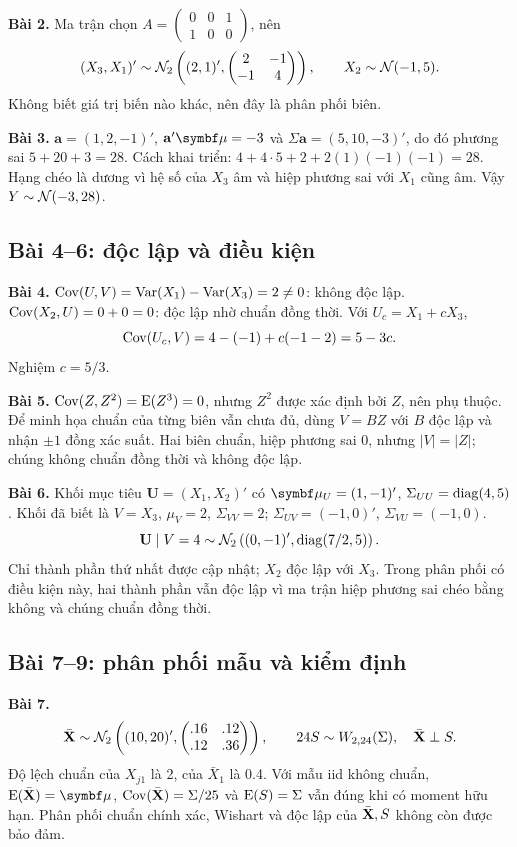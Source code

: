 \noindent\textbf{Bài 2.}
Ma trận chọn $A=\begin{pmatrix}0&0&1\\1&0&0\end{pmatrix}$, nên
\[
 (X_3,X_1)'\sim\mathcal N_2\left((2,1)',
 \begin{pmatrix}2&-1\\-1&4\end{pmatrix}\right),\qquad
 X_2\sim\mathcal N(-1,5).
\]
Không biết giá trị biến nào khác, nên đây là phân phối biên.

\noindent\textbf{Bài 3.}
$\mathbf a=(1,2,-1)'$, $\mathbf a'\vmu=-3$ và
$\Sigma\mathbf a=(5,10,-3)'$, do đó phương sai $5+20+3=28$.
Cách khai triển: $4+4\cdot5+2+2(1)(-1)(-1)=28$.
Hạng chéo là dương vì hệ số của $X_3$ âm và hiệp phương sai với $X_1$
cũng âm. Vậy $Y\sim\mathcal N(-3,28)$.

\subsection*{Bài 4--6: độc lập và điều kiện}
\noindent\textbf{Bài 4.}
$\operatorname{Cov}(U,V)=\operatorname{Var}(X_1)-\operatorname{Var}(X_3)=2\ne0$: không độc lập.
$\operatorname{Cov}(X_2,U)=0+0=0$: độc lập nhờ chuẩn đồng thời.
Với $U_c=X_1+cX_3$,
\[
 \operatorname{Cov}(U_c,V)=4-(-1)+c(-1-2)=5-3c.
\]
Nghiệm $c=5/3$.

\noindent\textbf{Bài 5.}
$\operatorname{Cov}(Z,Z^2)=\operatorname{E}(Z^3)=0$, nhưng $Z^2$ được xác định bởi $Z$, nên phụ
thuộc. Để minh họa chuẩn của từng biên vẫn chưa đủ, dùng $V=BZ$ với $B$
độc lập và nhận $\pm1$ đồng xác suất. Hai biên chuẩn, hiệp phương sai
0, nhưng $|V|=|Z|$; chúng không chuẩn đồng thời và không độc lập.

\noindent\textbf{Bài 6.}
Khối mục tiêu $\mathbf U=(X_1,X_2)'$ có
$\vmu_U=(1,-1)'$, $\Sigma_{UU}=\operatorname{diag}(4,5)$.
Khối đã biết là $V=X_3$, $\mu_V=2$, $\Sigma_{VV}=2$;
$\Sigma_{UV}=(-1,0)'$, $\Sigma_{VU}=(-1,0)$.
\[
 \mathbf U\mid V=4\sim\mathcal N_2\left((0,-1)',\operatorname{diag}(7/2,5)\right).
\]
Chỉ thành phần thứ nhất được cập nhật; $X_2$ độc lập với $X_3$.
Trong phân phối có điều kiện này, hai thành phần vẫn độc lập vì ma trận
hiệp phương sai chéo bằng không và chúng chuẩn đồng thời.

\subsection*{Bài 7--9: phân phối mẫu và kiểm định}
\noindent\textbf{Bài 7.}
\[
 \bar{\mathbf X}\sim\mathcal N_2\left((10,20)',
 \begin{pmatrix}.16&.12\\.12&.36\end{pmatrix}\right),\qquad
 24S\sim W_{2,24}(\Sigma),\quad\bar{\mathbf X}\perp S.
\]
Độ lệch chuẩn của $X_{j1}$ là 2, của $\bar X_1$ là 0.4.
Với mẫu iid không chuẩn, $\E(\Xbar)=\vmu$, $\operatorname{Cov}(\bar{\mathbf X})=\Sigma/25$
và $\operatorname{E}(S)=\Sigma$ vẫn đúng khi có moment hữu hạn. Phân phối chuẩn chính
xác, Wishart và độc lập của $\bar{\mathbf X},S$ không còn được bảo đảm.

